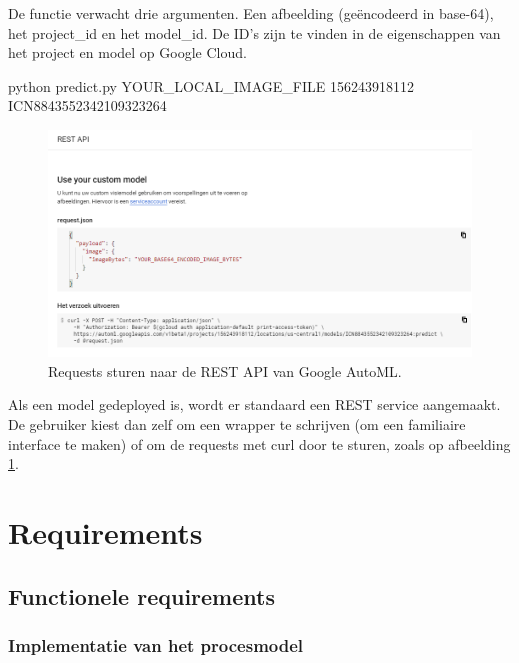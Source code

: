De functie verwacht drie argumenten. Een afbeelding (geëncodeerd in base-64), het project\_id en het model\_id. De ID's zijn te vinden in de eigenschappen van het project en model op Google Cloud.

\bigskip

\begin{python}
python predict.py YOUR_LOCAL_IMAGE_FILE 156243918112 ICN8843552342109323264
\end{python}

\begin{figure}
    \centering
    \includegraphics[width=\linewidth]{img/google-automl-rest.png}
    \caption{Requests sturen naar de REST API van Google AutoML.}
    \label{fig:google-automl-rest}
\end{figure}

Als een model gedeployed is, wordt er standaard een REST service aangemaakt. De gebruiker kiest dan zelf om een wrapper te schrijven (om een familiaire interface te maken) of om de requests met curl door te sturen, zoals op afbeelding \ref{fig:google-automl-rest}. 


\section{Requirements}
\label{sec:google-requirements}

\subsection{Functionele requirements}
\label{subsec:google-fr}

\subsubsection{Implementatie van het procesmodel}
\label{sucsubsec:google-fr-procesmodel}

